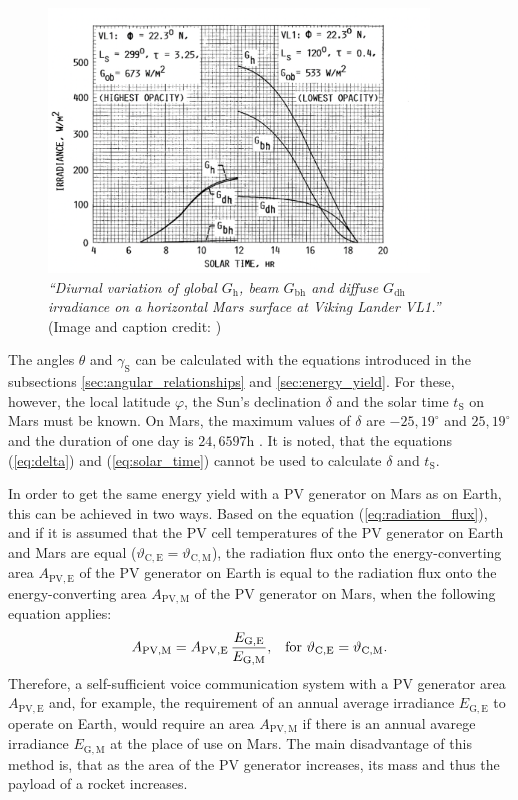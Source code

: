 \begin{figure}[h!]
	\centering
  	\includegraphics[width = 0.9\textwidth]{images/image_mars_irradiance_opacity}
  	\caption{\textit{``Diurnal variation of global $G_\mathrm{h}$, beam $G_\mathrm{bh}$ and diffuse $G_\mathrm{dh}$ irradiance on a horizontal Mars surface at Viking Lander VL1.''} (Image and caption credit: \cite{Appelbaum:1990})}
	\label{fig:image_mars_irradiance_opacity}
\end{figure}

The angles $\theta$ and $\gamma_\mathrm{S}$ can be calculated with the equations introduced in the subsections \ref{sec:angular_relationships} and \ref{sec:energy_yield}. For these, however, the local latitude $\varphi$, the Sun's declination $\delta$ and the solar time $t_\mathrm{S}$ on Mars must be known. On Mars, the maximum values of $\delta$ are $-25,19^\circ$ and $25,19^\circ$ and the duration of one day is $24,6597\mathrm{h}$ \cite{Grayzeck:2020}. It is noted, that the equations (\ref{eq:delta}) and (\ref{eq:solar_time}) cannot be used to calculate $\delta$ and $t_\mathrm{S}$.

In order to get the same energy yield with a PV generator on Mars as on Earth, this can be achieved in two ways. Based on the equation (\ref{eq:radiation_flux}), and if it is assumed that the PV cell temperatures of the PV generator on Earth and Mars are equal ($\vartheta_\mathrm{C,E} = \vartheta_\mathrm{C,M}$), the radiation flux onto the energy-converting area $A_\mathrm{PV,E}$ of the PV generator on Earth is equal to the radiation flux onto the energy-converting area $A_\mathrm{PV,M}$ of the PV generator on Mars, when the following equation applies:
\begin{equation} \label{eq:pv_area_comparison}
	\centering
		A_{\mathrm{PV,M}} = A_{\mathrm{PV,E}} \, \dfrac{E_{\mathrm{G,E}}}{E_{\mathrm{G,M}}}\text{,} \quad \text{for } \vartheta_\mathrm{C,E} = \vartheta_\mathrm{C,M} \text{.}
\end{equation}
Therefore, a self-sufficient voice communication system with a PV generator area $A_{\mathrm{PV,E}}$ and, for example, the requirement of an annual average irradiance $E_{\mathrm{G,E}}$ to operate on Earth, would require an area $A_{\mathrm{PV,M}}$ if there is an annual avarege irradiance $E_{\mathrm{G,M}}$ at the place of use on Mars. The main disadvantage of this method is, that as the area of the PV generator increases, its mass and thus the payload of a rocket increases. 

